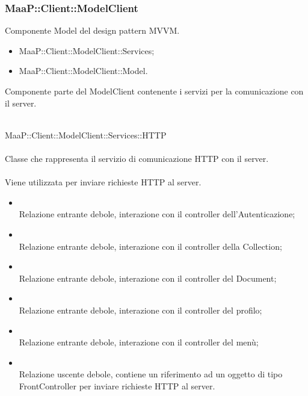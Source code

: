 \subsubsection{MaaP::Client::ModelClient}
Componente Model del design pattern MVVM.
\begin{itemize}
\item MaaP::Client::ModelClient::Services;
\item MaaP::Client::ModelClient::Model.
\end{itemize}

Componente parte del ModelClient contenente i servizi per la comunicazione con il server.

	\\
	MaaP::Client::ModelClient::Services::HTTP\\
	\\
	Classe che rappresenta il servizio di comunicazione HTTP con il server.\\
	\\
	Viene utilizzata per inviare richieste HTTP al server.\\
	\begin{itemize}
	\item{}\\
	Relazione entrante debole, interazione con il controller dell'Autenticazione;
	\item{}\\
	Relazione entrante debole, interazione con il controller della Collection;
	\item{}\\
	Relazione entrante debole, interazione con il controller del Document;
	\item{}\\
	Relazione entrante debole, interazione con il controller del profilo;
	\item{}\\
	Relazione entrante debole, interazione con il controller del menù;
	\item{}\\
	Relazione uscente debole, contiene un riferimento ad un oggetto di tipo FrontController per inviare richieste HTTP al server.
	\end{itemize}

